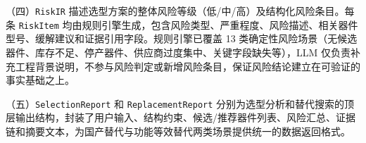 （四）\texttt{RiskIR} 描述选型方案的整体风险等级（低/中/高）及结构化风险条目。每条 \texttt{RiskItem} 均由规则引擎生成，包含风险类型、严重程度、风险描述、相关器件型号、缓解建议和证据引用字段。规则引擎已覆盖 13 类确定性风险场景（无候选器件、库存不足、停产器件、供应商过度集中、关键字段缺失等），LLM 仅负责补充工程背景说明，不参与风险判定或新增风险条目，保证风险结论建立在可验证的事实基础之上。


（五）\texttt{SelectionReport} 和 \texttt{ReplacementReport} 分别为选型分析和替代搜索的顶层输出结构，封装了用户输入、结构约束、候选/推荐器件列表、风险汇总、证据链和摘要文本，为国产替代与功能等效替代两类场景提供统一的数据返回格式。
